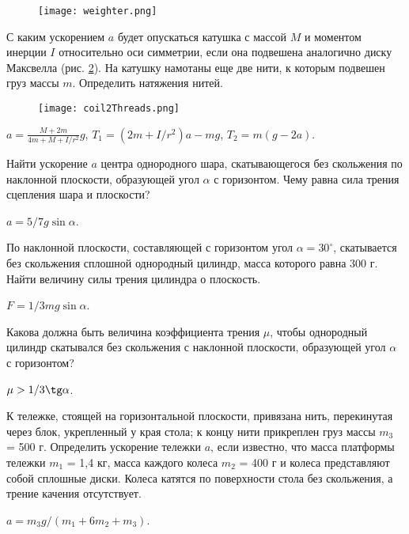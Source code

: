 \begin{figure}[h]
\centering
\texttt{[image: weighter.png]}
\caption{}
\label{weighter}
\end{figure}

\begin{ex} %
С каким ускорением $a$ будет опускаться катушка с массой $M$ и моментом инерции $I$ относительно оси симметрии, если она подвешена аналогично диску Максвелла (рис. \ref{coil2Threads}). На катушку намотаны еще две нити, к которым подвешен груз массы $m$. Определить натяжения нитей.

\begin{figure}
\centering
\texttt{[image: coil2Threads.png]}
\caption{}
\label{coil2Threads}
\end{figure}

\begin{ans}
$a = \frac{M+2m}{4m+M+I/r^2}g$, $T_1 = (2m+I/r^2)a - mg$, $T_2=m(g-2a)$.
\end{ans}
\end{ex}	

\begin{ex} %
Найти ускорение $a$ центра однородного шара, скатывающегося без скольжения по наклонной плоскости, образующей угол $\alpha$ с горизонтом. Чему равна сила трения сцепления шара и плоскости?
\begin{ans}
$a=5/7g\sin \alpha$.
\end{ans}
\end{ex}	

\begin{ex} %
По наклонной плоскости, составляющей с горизонтом угол $\alpha = 30^{\circ}$, скатывается без скольжения сплошной однородный цилиндр, масса которого равна 300 г. Найти величину силы трения цилиндра о плоскость.
\begin{ans}
$F = 1/3 mg \sin \alpha$.
\end{ans}
\end{ex}	

\begin{ex} %
Какова должна быть величина коэффициента трения $\mu$, чтобы однородный цилиндр скатывался без скольжения с наклонной плоскости, образующей угол $\alpha$ с горизонтом?
\begin{ans}
$\mu > 1/3 \tg \alpha$.
\end{ans}
\end{ex}	

\begin{ex} %
К тележке, стоящей на горизонтальной плоскости, привязана нить, перекинутая через блок, укрепленный у края стола; к концу нити прикреплен груз массы $m_3$ = 500 г. Определить ускорение тележки $a$, если известно, что масса платформы тележки $m_1$ = 1,4 кг, масса каждого колеса $m_2$ = 400 г и колеса представляют собой сплошные диски. Колеса катятся по поверхности стола без скольжения, а трение качения отсутствует.
\begin{ans}
$a = m_3g/(m_1 + 6m_2 +m_3)$.
\end{ans}
\end{ex}	

\clearpage